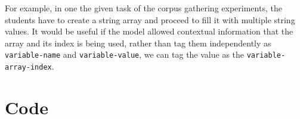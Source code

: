 \documentclass[fyp]{socreport}
\begin{document}
For example, in one the given task of the corpus gathering experiments, the
students have to create a string array and proceed to fill it with multiple
string values. It would be useful if the model allowed contextual information
that the array and its index is being used, rather than tag them independently
as \texttt{variable-name} and \texttt{variable-value}, we can tag the value as
the \texttt{variable-array-index}.


\printbibliography[title={Whole bibliography}]

\appendix
\chapter{Code}
\end{document}
